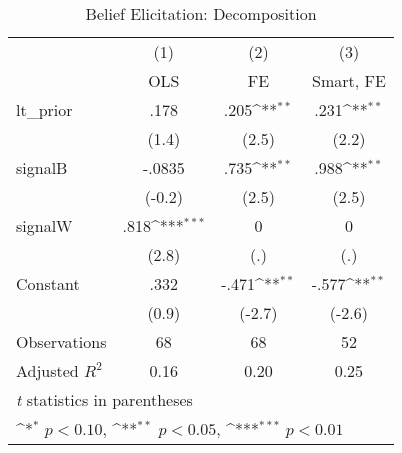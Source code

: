 \begin{table}[htbp]\centering
\def\sym#1{\ifmmode^{#1}\else\(^{#1}\)\fi}
\caption{Belief Elicitation: Decomposition}
\begin{tabular}{l*{3}{c}}
\hline\hline
                &\multicolumn{1}{c}{(1)}&\multicolumn{1}{c}{(2)}&\multicolumn{1}{c}{(3)}\\
                &\multicolumn{1}{c}{OLS}&\multicolumn{1}{c}{FE}&\multicolumn{1}{c}{Smart, FE}\\
\hline
lt\_prior        &     .178         &     .205\sym{**} &     .231\sym{**} \\
                &    (1.4)         &    (2.5)         &    (2.2)         \\
signalB         &   -.0835         &     .735\sym{**} &     .988\sym{**} \\
                &   (-0.2)         &    (2.5)         &    (2.5)         \\
signalW         &     .818\sym{***}&        0         &        0         \\
                &    (2.8)         &      (.)         &      (.)         \\
Constant        &     .332         &    -.471\sym{**} &    -.577\sym{**} \\
                &    (0.9)         &   (-2.7)         &   (-2.6)         \\
\hline
Observations    &       68         &       68         &       52         \\
Adjusted \(R^{2}\)&     0.16         &     0.20         &     0.25         \\
\hline\hline
\multicolumn{4}{l}{\footnotesize \textit{t} statistics in parentheses}\\
\multicolumn{4}{l}{\footnotesize \sym{*} \(p<0.10\), \sym{**} \(p<0.05\), \sym{***} \(p<0.01\)}\\
\end{tabular}
\end{table}
